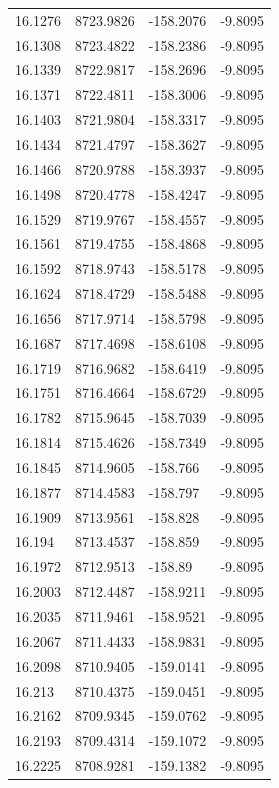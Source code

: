 \begin{table}[H]
\begin{tabular}{llll}
16.1276 & 8723.9826 & -158.2076 & -9.8095 \\
16.1308 & 8723.4822 & -158.2386 & -9.8095 \\
16.1339 & 8722.9817 & -158.2696 & -9.8095 \\
16.1371 & 8722.4811 & -158.3006 & -9.8095 \\
16.1403 & 8721.9804 & -158.3317 & -9.8095 \\
16.1434 & 8721.4797 & -158.3627 & -9.8095 \\
16.1466 & 8720.9788 & -158.3937 & -9.8095 \\
16.1498 & 8720.4778 & -158.4247 & -9.8095 \\
16.1529 & 8719.9767 & -158.4557 & -9.8095 \\
16.1561 & 8719.4755 & -158.4868 & -9.8095 \\
16.1592 & 8718.9743 & -158.5178 & -9.8095 \\
16.1624 & 8718.4729 & -158.5488 & -9.8095 \\
16.1656 & 8717.9714 & -158.5798 & -9.8095 \\
16.1687 & 8717.4698 & -158.6108 & -9.8095 \\
16.1719 & 8716.9682 & -158.6419 & -9.8095 \\
16.1751 & 8716.4664 & -158.6729 & -9.8095 \\
16.1782 & 8715.9645 & -158.7039 & -9.8095 \\
16.1814 & 8715.4626 & -158.7349 & -9.8095 \\
16.1845 & 8714.9605 & -158.766 & -9.8095 \\
16.1877 & 8714.4583 & -158.797 & -9.8095 \\
16.1909 & 8713.9561 & -158.828 & -9.8095 \\
16.194 & 8713.4537 & -158.859 & -9.8095 \\
16.1972 & 8712.9513 & -158.89 & -9.8095 \\
16.2003 & 8712.4487 & -158.9211 & -9.8095 \\
16.2035 & 8711.9461 & -158.9521 & -9.8095 \\
16.2067 & 8711.4433 & -158.9831 & -9.8095 \\
16.2098 & 8710.9405 & -159.0141 & -9.8095 \\
16.213 & 8710.4375 & -159.0451 & -9.8095 \\
16.2162 & 8709.9345 & -159.0762 & -9.8095 \\
16.2193 & 8709.4314 & -159.1072 & -9.8095 \\
16.2225 & 8708.9281 & -159.1382 & -9.8095 \\

\end{tabular}
\end{table}
